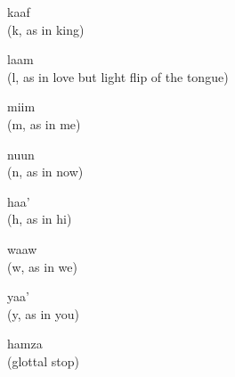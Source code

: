 \begin{flashcard}{\LARGE kaaf \\ (k, as in king)}
\LARGE {}
\end{flashcard}
\begin{flashcard}{\LARGE laam \\ (l, as in love but light flip of the tongue)}
\LARGE {}
\end{flashcard}
\begin{flashcard}{\LARGE miim \\ (m, as in me)}
\LARGE {}
\end{flashcard}
\begin{flashcard}{\LARGE nuun \\ (n, as in now)}
\LARGE {}
\end{flashcard}
\begin{flashcard}{\LARGE haa' \\ (h, as in hi)}
\LARGE {}
\end{flashcard}
\begin{flashcard}{\LARGE waaw \\ (w, as in we)}
\LARGE {}
\end{flashcard}
\begin{flashcard}{\LARGE yaa' \\ (y, as in you)}
\LARGE {}
\end{flashcard}
\begin{flashcard}{\LARGE hamza \\ (glottal stop)}
\LARGE {}
\end{flashcard}

